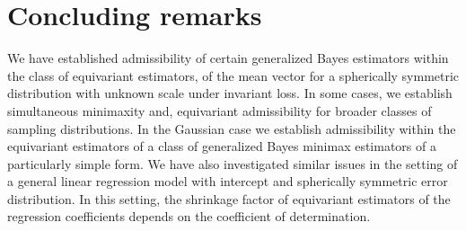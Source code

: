 \documentclass[preprint,11pt]{imsart}
\numberwithin{equation}{section}
\theoremstyle{plain}
\theoremstyle{definition}
\theoremstyle{remark}
\begin{document}
\section{Concluding remarks}
\label{sec.cr}
We have established admissibility of certain generalized Bayes estimators
within the class of equivariant estimators, of the mean vector for a spherically
symmetric distribution with unknown scale under invariant loss.
In some cases, we establish simultaneous minimaxity and, equivariant admissibility
 for broader classes of sampling distributions. In the Gaussian case we establish
 admissibility within the equivariant estimators
 of a class of generalized Bayes minimax estimators of a particularly simple form.
 We have also investigated similar issues in the setting of a general linear regression
 model with intercept and spherically symmetric error distribution. In this setting,
 the shrinkage factor of equivariant estimators of the regression coefficients depends
 on the coefficient of determination.
 
\appendix
\end{document}
